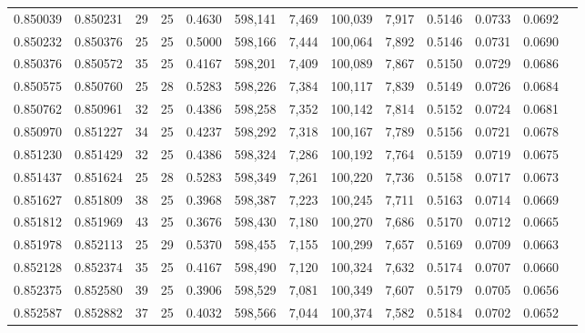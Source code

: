 \begin{tabular}{rrrrrrrrrrrrr}
0.850039 & 0.850231 &    29 &  25 &                                     0.4630 & 598,141 &   7,469 & 100,039 &   7,917 & 0.5146 & 0.0733 & 0.0692 \\
0.850232 & 0.850376 &    25 &  25 &                                     0.5000 & 598,166 &   7,444 & 100,064 &   7,892 & 0.5146 & 0.0731 & 0.0690 \\
0.850376 & 0.850572 &    35 &  25 &                                     0.4167 & 598,201 &   7,409 & 100,089 &   7,867 & 0.5150 & 0.0729 & 0.0686 \\
0.850575 & 0.850760 &    25 &  28 &                                     0.5283 & 598,226 &   7,384 & 100,117 &   7,839 & 0.5149 & 0.0726 & 0.0684 \\
0.850762 & 0.850961 &    32 &  25 &                                     0.4386 & 598,258 &   7,352 & 100,142 &   7,814 & 0.5152 & 0.0724 & 0.0681 \\
0.850970 & 0.851227 &    34 &  25 &                                     0.4237 & 598,292 &   7,318 & 100,167 &   7,789 & 0.5156 & 0.0721 & 0.0678 \\
0.851230 & 0.851429 &    32 &  25 &                                     0.4386 & 598,324 &   7,286 & 100,192 &   7,764 & 0.5159 & 0.0719 & 0.0675 \\
0.851437 & 0.851624 &    25 &  28 &                                     0.5283 & 598,349 &   7,261 & 100,220 &   7,736 & 0.5158 & 0.0717 & 0.0673 \\
0.851627 & 0.851809 &    38 &  25 &                                     0.3968 & 598,387 &   7,223 & 100,245 &   7,711 & 0.5163 & 0.0714 & 0.0669 \\
0.851812 & 0.851969 &    43 &  25 &                                     0.3676 & 598,430 &   7,180 & 100,270 &   7,686 & 0.5170 & 0.0712 & 0.0665 \\
0.851978 & 0.852113 &    25 &  29 &                                     0.5370 & 598,455 &   7,155 & 100,299 &   7,657 & 0.5169 & 0.0709 & 0.0663 \\
0.852128 & 0.852374 &    35 &  25 &                                     0.4167 & 598,490 &   7,120 & 100,324 &   7,632 & 0.5174 & 0.0707 & 0.0660 \\
0.852375 & 0.852580 &    39 &  25 &                                     0.3906 & 598,529 &   7,081 & 100,349 &   7,607 & 0.5179 & 0.0705 & 0.0656 \\
0.852587 & 0.852882 &    37 &  25 &                                     0.4032 & 598,566 &   7,044 & 100,374 &   7,582 & 0.5184 & 0.0702 & 0.0652 \\

\end{tabular}
